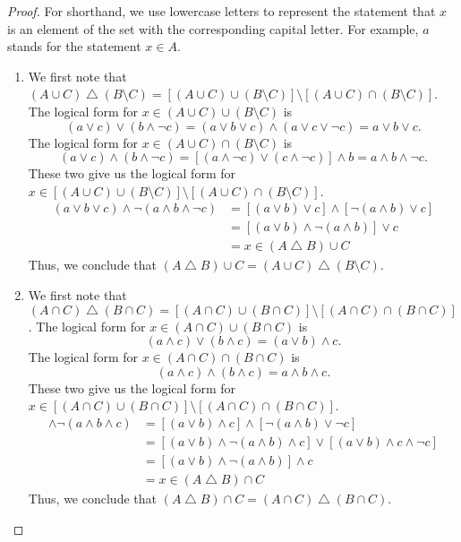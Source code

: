 \documentclass[12pt]{amsart}
\theoremstyle{definition}
\theoremstyle{remark}
\begin{document}
\begin{proof}
For shorthand, we use lowercase letters to represent the statement that $x$ is an element of the set with the corresponding capital letter.
For example, $a$ stands for the statement $x \in A$.
\begin{enumerate}
	\item We first note that $(A \cup C) \bigtriangleup (B \setminus C) = [(A \cup C) \cup (B \setminus C)] \setminus [(A \cup C) \cap (B \setminus C)]$.
	The logical form for $x \in (A \cup C) \cup (B \setminus C)$ is
	\begin{equation*}
		(a \vee c) \vee (b \wedge \neg c)
		= (a \vee b \vee c) \wedge (a \vee c \vee \neg c) 
		= a \vee b \vee c.
	\end{equation*}
	The logical form for $x \in (A \cup C) \cap (B \setminus C)$ is
	\begin{equation*}
		(a \vee c) \wedge (b \wedge \neg c)
		= [(a \wedge \neg c) \vee (c \wedge \neg c)] \wedge b
		= a \wedge b \wedge \neg c.
	\end{equation*}
	These two give us the logical form for $x \in [(A \cup C) \cup (B \setminus C)] \setminus [(A \cup C) \cap (B \setminus C)]$.
	\begin{align*}
		(a \vee b \vee c) \wedge \neg (a \wedge b \wedge \neg c)
		&= [(a \vee b) \vee c] \wedge [\neg (a \wedge b) \vee c] \\
		&= [(a \vee b) \wedge \neg (a \wedge b)] \vee c \\
		&= x \in (A \bigtriangleup B) \cup C
	\end{align*}
	Thus, we conclude that $(A \bigtriangleup B) \cup C = (A \cup C) \bigtriangleup (B \setminus C)$.
	
	\item We first note that $(A \cap C) \bigtriangleup (B \cap C) = [(A \cap C) \cup (B \cap C)] \setminus [(A \cap C) \cap (B \cap C)]$.
	The logical form for $x \in (A \cap C) \cup (B \cap C)$ is
	\begin{equation*}
		(a \wedge c) \vee (b \wedge c)
		= (a \vee b) \wedge c.
	\end{equation*}
	The logical form for $x \in (A \cap C) \cap (B \cap C)$ is
	\begin{equation*}
		(a \wedge c) \wedge (b \wedge c)
		= a \wedge b \wedge c.
	\end{equation*}
	These two give us the logical form for $x \in  [(A \cap C) \cup (B \cap C)] \setminus [(A \cap C) \cap (B \cap C)]$.
	\begin{align*}
		[(a \vee b) \wedge c] \wedge \neg (a \wedge b \wedge c)
		&= [(a \vee b) \wedge c] \wedge [\neg (a \wedge b) \vee \neg c] \\
		&= [(a \vee b) \wedge \neg (a \wedge b) \wedge c] \vee [(a \vee b) \wedge c \wedge \neg c] \\
		&= [(a \vee b) \wedge \neg (a \wedge b)] \wedge c \\
		&= x \in (A \bigtriangleup B) \cap C
	\end{align*}
	Thus, we conclude that $(A \bigtriangleup B) \cap C = (A \cap C) \bigtriangleup (B \cap C)$.
	

\end{enumerate}
\end{proof}
\end{document}
